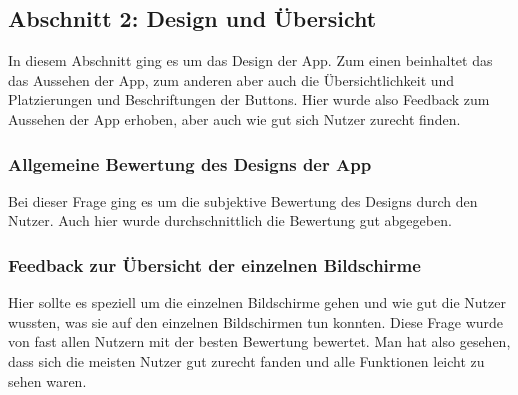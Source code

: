    \subsection{Abschnitt 2: Design und Übersicht}

        In diesem Abschnitt ging es um das Design der App. Zum einen beinhaltet das das Aussehen der App, zum anderen aber auch die Übersichtlichkeit und Platzierungen und Beschriftungen der Buttons. Hier wurde also Feedback zum Aussehen der App erhoben, aber auch wie gut sich Nutzer zurecht finden.

        \subsubsection{Allgemeine Bewertung des Designs der App}

            Bei dieser Frage ging es um die subjektive Bewertung des Designs durch den Nutzer. Auch hier wurde durchschnittlich die Bewertung gut abgegeben.

            \begin{bchart} [min = 0, max = 10, step = 2]
                \bigskip
                \bigskip
                \bigskip
                \bigskip
            \end{bchart}

        \newpage

        \subsubsection{Feedback zur Übersicht der einzelnen Bildschirme}

            Hier sollte es speziell um die einzelnen Bildschirme gehen und wie gut die Nutzer wussten, was sie auf den einzelnen Bildschirmen tun konnten. Diese Frage wurde von fast allen Nutzern mit der besten Bewertung bewertet. Man hat also gesehen, dass sich die meisten Nutzer gut zurecht fanden und alle Funktionen leicht zu sehen waren.

            \begin{bchart} [min = 0, max = 10, step = 2]
                \bigskip
                \bigskip
                \bigskip
                \bigskip
                \end{bchart}

